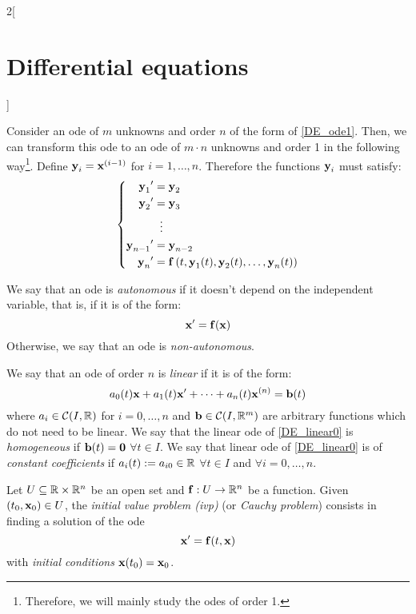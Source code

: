 \documentclass[../../../main.tex]{subfiles}
\begin{document}
\begin{multicols}{2}[\section{Differential equations}]
    \begin{prop}
        Consider an ode of $m$ unknowns and order $n$ of the form of \cref{DE_ode1}. Then, we can transform this ode to an ode of $m\cdot n$ unknowns and order 1 in the following way\footnote{Therefore, we will mainly study the odes of order 1.}. Define $\boldsymbol{\mathrm{y}}_i=\boldsymbol{\mathrm{x}}^{(i-1)}$ for $i=1,\ldots,n$. Therefore the functions $\boldsymbol{\mathrm{y}}_i$ must satisfy:
        \begin{equation*}
            \left\{
            \begin{aligned}
                {\boldsymbol{\mathrm{y}}_1}'     & =\boldsymbol{\mathrm{y}}_2                                                        \\
                {\boldsymbol{\mathrm{y}}_2}'     & =\boldsymbol{\mathrm{y}}_3                                                        \\
                                & \;\;\vdots                                                       \\
                {\boldsymbol{\mathrm{y}}_{n-1}}' & =\boldsymbol{\mathrm{y}}_{n-2}                                                    \\
                {\boldsymbol{\mathrm{y}}_n}'     & =\boldsymbol{\mathrm{f}}\left(t,\boldsymbol{\mathrm{y}}_1(t),\boldsymbol{\mathrm{y}}_2(t),\ldots,\boldsymbol{\mathrm{y}}_n(t)\right) \\
            \end{aligned}
            \right.
        \end{equation*}
    \end{prop}
    \begin{definition}
        We say that an ode is \textit{autonomous} if it doesn't depend on the independent variable, that is, if it is of the form: $$\boldsymbol{\mathrm{x}}'=\boldsymbol{\mathrm{f}}(\boldsymbol{\mathrm{x}})$$ Otherwise, we say that an ode is \textit{non-autonomous}.
    \end{definition}
    \begin{definition}
        We say that an ode of order $n$ is \textit{linear} if it is of the form:
        \begin{equation}\label{DE_linear0}
            a_0(t)\boldsymbol{\mathrm{x}}+a_1(t)\boldsymbol{\mathrm{x}}'+\cdots+a_n(t)\boldsymbol{\mathrm{x}}^{(n)}=\boldsymbol{\mathrm{b}}(t)
        \end{equation}
        where $a_i\in\mathcal{C}(I,\mathbb{R})$ for $i=0,\ldots,n$ and $\boldsymbol{\mathrm{b}}\in\mathcal{C}(I,\mathbb{R}^m)$ are arbitrary functions which do not need to be linear. We say that the linear ode of \cref{DE_linear0} is \textit{homogeneous} if $\boldsymbol{\mathrm{b}}(t)=\boldsymbol{\mathrm{0}}$ $\forall t\in I$. We say that linear ode of \cref{DE_linear0} is of \textit{constant coefficients} if $a_i(t):=a_{i0}\in\mathbb{R}$ $\forall t\in I$ and $\forall i=0,\ldots,n$.
    \end{definition}
    \begin{definition}
        Let $U\subseteq\mathbb{R}\times\mathbb{R}^n$ be an open set and $\boldsymbol{\mathrm{f}}:U\rightarrow\mathbb{R}^n$ be a function. Given $(t_0,\boldsymbol{\mathrm{x}}_0)\in U$, the \textit{initial value problem (ivp)} (or \textit{Cauchy problem}) consists in finding a solution of the ode $$\boldsymbol{\mathrm{x}}'=\boldsymbol{\mathrm{f}}(t,\boldsymbol{\mathrm{x}})$$ with \textit{initial conditions} $\boldsymbol{\mathrm{x}}(t_0)=\boldsymbol{\mathrm{x}}_0$.
    \end{definition}

\end{multicols}
\end{document}
